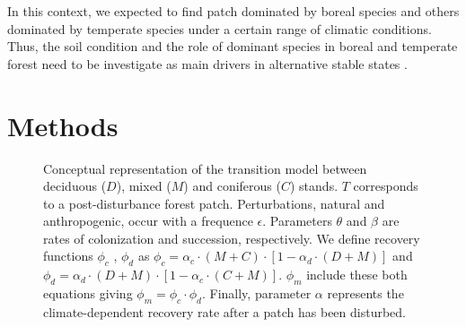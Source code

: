 
In this context, we expected to find patch dominated by boreal species and
others dominated by temperate species under a certain range of climatic
conditions. Thus, the soil condition and the role of dominant species in
boreal and temperate forest need to be investigate as main drivers in
alternative stable states
\cite{Kellman2004,Moore2008,DeFrenne2013,Barras1998}.


\section{Methods}   

\begin{figure}
	
	\caption{Conceptual representation of the transition model between deciduous ($D$),
	mixed ($M$) and coniferous ($C$) stands. $T$ corresponds to a post-disturbance forest patch. Perturbations, natural and anthropogenic, occur with a frequence $\epsilon$. Parameters $\theta$ and $\beta$ are rates of colonization and succession,
	respectively. We define recovery functions $\phi_c$ , $\phi_d$ as $\phi_c
	= \alpha_c \cdot (M+C) \cdot [1- \alpha_d \cdot (D +M)]$ and $\phi_d =
	\alpha_d \cdot (D+M) \cdot [1- \alpha_c \cdot (C +M)]$. $\phi_m$ include these both equations giving $\phi_m = \phi_c \cdot \phi_d$. Finally, parameter $\alpha$ represents the climate-dependent recovery rate after a patch has been disturbed.}
	\label{Model}
	\vspace{-1em}
\end{figure}


